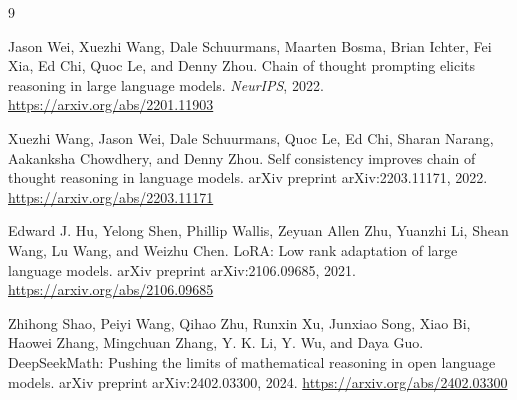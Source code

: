 \documentclass[11pt]{article}
\begin{document}
\begin{thebibliography}{9}

Jason Wei, Xuezhi Wang, Dale Schuurmans, Maarten Bosma, Brian Ichter, Fei Xia, Ed Chi, Quoc Le, and Denny Zhou.
\newblock Chain of thought prompting elicits reasoning in large language models.
\newblock \emph{NeurIPS}, 2022.
\newblock \url{https://arxiv.org/abs/2201.11903}

Xuezhi Wang, Jason Wei, Dale Schuurmans, Quoc Le, Ed Chi, Sharan Narang, Aakanksha Chowdhery, and Denny Zhou.
\newblock Self consistency improves chain of thought reasoning in language models.
\newblock arXiv preprint arXiv:2203.11171, 2022.
\newblock \url{https://arxiv.org/abs/2203.11171}

Edward J. Hu, Yelong Shen, Phillip Wallis, Zeyuan Allen Zhu, Yuanzhi Li, Shean Wang, Lu Wang, and Weizhu Chen.
\newblock LoRA: Low rank adaptation of large language models.
\newblock arXiv preprint arXiv:2106.09685, 2021.
\newblock \url{https://arxiv.org/abs/2106.09685}

Zhihong Shao, Peiyi Wang, Qihao Zhu, Runxin Xu, Junxiao Song, Xiao Bi, Haowei Zhang, Mingchuan Zhang, Y. K. Li, Y. Wu, and Daya Guo.
\newblock DeepSeekMath: Pushing the limits of mathematical reasoning in open language models.
\newblock arXiv preprint arXiv:2402.03300, 2024.
\newblock \url{https://arxiv.org/abs/2402.03300}

\end{thebibliography}
\end{document}

